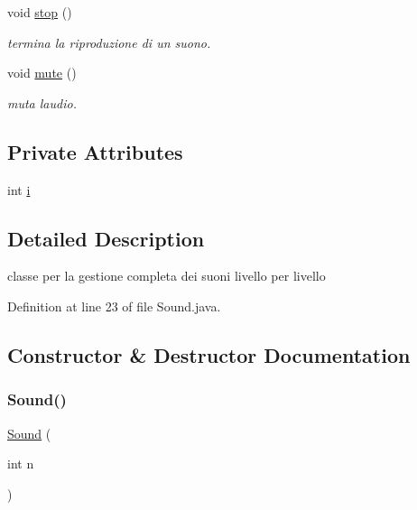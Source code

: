 \begin{DoxyCompactItemize}
void \hyperlink{classprogetto_1_1_sound_a8c528baf37154d347366083f0f816846}{stop} ()
\begin{DoxyCompactList}\small\item\em termina la riproduzione di un suono. \end{DoxyCompactList}\item 
void \hyperlink{classprogetto_1_1_sound_a4641ac073645140bf1f9577c2587fe3b}{mute} ()
\begin{DoxyCompactList}\small\item\em muta l\textquotesingle{}audio. \end{DoxyCompactList}\end{DoxyCompactItemize}
\subsection*{Private Attributes}
\begin{DoxyCompactItemize}
\item 
int \hyperlink{classprogetto_1_1_sound_acb559820d9ca11295b4500f179ef6392}{i}
\end{DoxyCompactItemize}


\subsection{Detailed Description}
classe per la gestione completa dei suoni livello per livello 

Definition at line 23 of file Sound.\+java.



\subsection{Constructor \& Destructor Documentation}
\mbox{\label{classprogetto_1_1_sound_aed1261999531d2ad6a7ee45254d5d192}} 
\subsubsection{\texorpdfstring{Sound()}{Sound()}}
{\footnotesize\ttfamily \hyperlink{classprogetto_1_1_sound}{Sound} (\begin{DoxyParamCaption}\item[{int}]{n }\end{DoxyParamCaption})}



